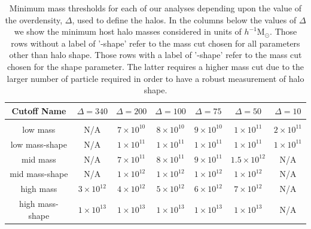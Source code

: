 \documentclass[usenatbib]{mnras}
\begin{document}


\begin{table}
\caption{
Minimum mass thresholds for each of our analyses depending upon the 
value of the overdensity, $\Delta$, used to define the halos. 
In the columns below the values of $\Delta$ we show the minimum 
host halo masses considered in units of $h^{-1}\mathrm{M}_{\odot}$.
Those rows without a label of '-shape' refer to the mass cut chosen for all parameters other than
halo shape. Those rows with a label of '-shape' refer to the mass cut chosen for the shape parameter.
The latter requires a higher mass cut due to the larger number of particle required in order to have a
robust measurement of halo shape.}
\vspace*{8pt}
\begin{tabular}{ c c c c c c c }
\hline
\hline
Cutoff Name &  $\Delta=340$ & $\Delta=200$ & $\Delta=100$ & $\Delta=75$ & $\Delta=50$ & $\Delta=10$ \\
\hline
\\{low mass} & {N/A} & $7 \times 10^{10}$ & $8 \times 10^{10}$ & $9 \times 10^{10}$ & $1 \times 10^{11}$ & $2 \times 10^{11}$  \\
{low mass-shape} & {N/A} & $1 \times 10^{11}$ & $1 \times 10^{11}$ & $1 \times 10^{11}$ & $1 \times 10^{11}$ & $1 \times 10^{11}$ \\
{mid mass} & {N/A} & $7 \times 10^{11}$ & $8 \times 10^{11}$ & $9 \times 10^{11}$ & $1.5 \times 10^{12}$ & {N/A} \\
{mid mass-shape} & {N/A} & $1 \times 10^{12}$ & $1 \times 10^{12}$ & $1 \times 10^{12}$ & $1 \times 10^{12}$ & {N/A} \\
{high mass} & $3 \times 10^{12}$ & $4 \times 10^{12}$ & $5 \times 10^{12}$ & $6 \times 10^{12}$ & $7 \times 10^{12}$ & {N/A} \\
{high mass-shape} & $1 \times 10^{13}$ & $1 \times 10^{13}$ & $1 \times 10^{13}$ & $1 \times 10^{13}$ & $1 \times 10^{13}$ & {N/A} \\
\hline
\hline
\end{tabular}
\label{table:thresholds}
\end{table}
\end{document}

